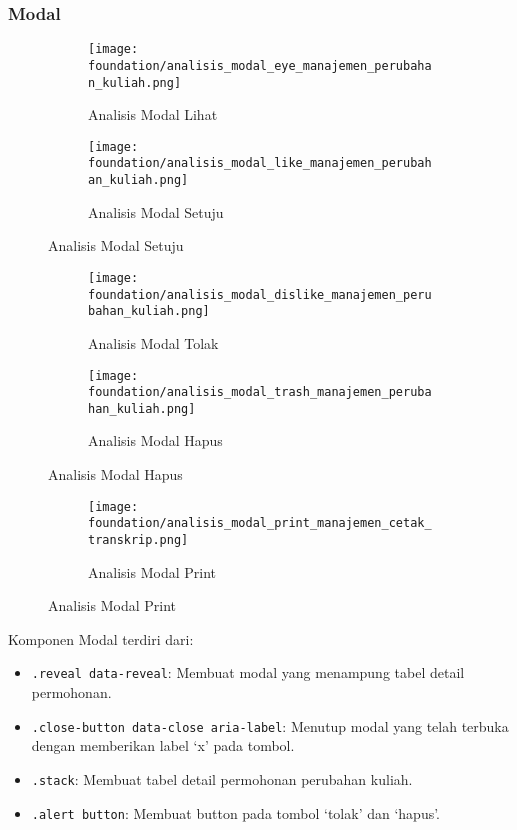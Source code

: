 \subsubsection{Modal}
\begin{figure}	
	\centering
	\begin{subfigure}[t]{3in}
		\centering  
		\texttt{[image: foundation/analisis\_modal\_eye\_manajemen\_perubahan\_kuliah.png]}
		\caption{Analisis Modal Lihat}  
	\end{subfigure}
	\quad
	\begin{subfigure}[t]{3in}		  
		\centering  
		\texttt{[image: foundation/analisis\_modal\_like\_manajemen\_perubahan\_kuliah.png]}
		\caption{Analisis Modal Setuju}
	\end{subfigure}
\end{figure}
\begin{figure}	
	\centering
	\begin{subfigure}[t]{3in}
		\centering 
		\texttt{[image: foundation/analisis\_modal\_dislike\_manajemen\_perubahan\_kuliah.png]}
		\caption{Analisis Modal Tolak}  
	\end{subfigure}
	\quad
	\begin{subfigure}[t]{3in}		  
		\centering  
		\texttt{[image: foundation/analisis\_modal\_trash\_manajemen\_perubahan\_kuliah.png]}
		\caption{Analisis Modal Hapus}
	\end{subfigure}
\end{figure}
\begin{figure}	
	\centering
	\begin{subfigure}[t]{3in}
		\centering 
		\texttt{[image: foundation/analisis\_modal\_print\_manajemen\_cetak\_transkrip.png]}
		\caption{Analisis Modal Print}  
	\end{subfigure}	
\end{figure}

Komponen Modal terdiri dari:
\begin{itemize}
	\item \texttt{.reveal data-reveal}: Membuat modal yang menampung tabel detail permohonan.
	\item \texttt{.close-button data-close aria-label}: Menutup modal yang telah terbuka dengan memberikan label `x' pada tombol.
	\item \texttt{.stack}:	Membuat tabel detail permohonan perubahan kuliah.
	\item \texttt{.alert button}: Membuat button pada tombol `tolak'  dan `hapus'.
\end{itemize}



